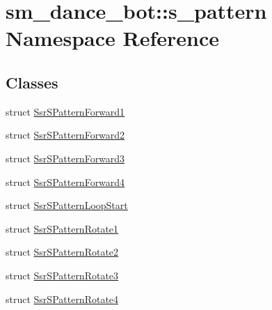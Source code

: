 \hypertarget{namespacesm__dance__bot_1_1s__pattern}{}\section{sm\+\_\+dance\+\_\+bot\+:\+:s\+\_\+pattern Namespace Reference}
\label{namespacesm__dance__bot_1_1s__pattern}
\subsection*{Classes}
\begin{DoxyCompactItemize}
\item 
struct \hyperlink{structsm__dance__bot_1_1s__pattern_1_1SsrSPatternForward1}{Ssr\+S\+Pattern\+Forward1}
\item 
struct \hyperlink{structsm__dance__bot_1_1s__pattern_1_1SsrSPatternForward2}{Ssr\+S\+Pattern\+Forward2}
\item 
struct \hyperlink{structsm__dance__bot_1_1s__pattern_1_1SsrSPatternForward3}{Ssr\+S\+Pattern\+Forward3}
\item 
struct \hyperlink{structsm__dance__bot_1_1s__pattern_1_1SsrSPatternForward4}{Ssr\+S\+Pattern\+Forward4}
\item 
struct \hyperlink{structsm__dance__bot_1_1s__pattern_1_1SsrSPatternLoopStart}{Ssr\+S\+Pattern\+Loop\+Start}
\item 
struct \hyperlink{structsm__dance__bot_1_1s__pattern_1_1SsrSPatternRotate1}{Ssr\+S\+Pattern\+Rotate1}
\item 
struct \hyperlink{structsm__dance__bot_1_1s__pattern_1_1SsrSPatternRotate2}{Ssr\+S\+Pattern\+Rotate2}
\item 
struct \hyperlink{structsm__dance__bot_1_1s__pattern_1_1SsrSPatternRotate3}{Ssr\+S\+Pattern\+Rotate3}
\item 
struct \hyperlink{structsm__dance__bot_1_1s__pattern_1_1SsrSPatternRotate4}{Ssr\+S\+Pattern\+Rotate4}
\end{DoxyCompactItemize}
